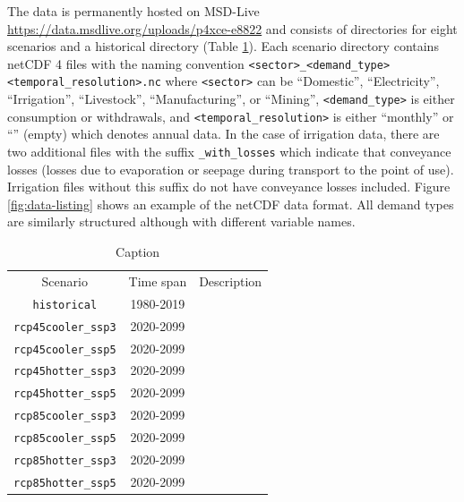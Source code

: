 \documentclass[fleqn,10pt]{wlscirep}
\begin{document}
The data is permanently hosted on MSD-Live \url{https://data.msdlive.org/uploads/p4xce-e8822} and consists of directories for eight scenarios and a historical directory (Table \ref{tab:scenarios}). Each scenario directory contains netCDF 4 files with the naming convention \verb|<sector>_<demand_type><temporal_resolution>.nc| where \verb|<sector>| can be ``Domestic'', ``Electricity'', ``Irrigation'', ``Livestock'', ``Manufacturing'', or ``Mining'', \verb|<demand_type>| is either consumption or withdrawals, and \verb|<temporal_resolution>| is either ``monthly'' or ``'' (empty) which denotes annual data. In the case of irrigation data, there are two additional files with the suffix \verb|_with_losses| which indicate that conveyance losses (losses due to evaporation or seepage during transport to the point of use). Irrigation files without this suffix do not have conveyance losses included. Figure \ref{fig:data-listing} shows an example of the netCDF data format. All demand types are similarly structured although with different variable names. 

\begin{table}
    \centering
    \begin{tabular}{ccc}
        Scenario & Time span & Description \\
        \verb|historical| & 1980-2019 & \\
        \verb|rcp45cooler_ssp3| & 2020-2099 & \\
        \verb|rcp45cooler_ssp5| & 2020-2099 & \\
        \verb|rcp45hotter_ssp3| & 2020-2099 & \\
        \verb|rcp45hotter_ssp5| & 2020-2099 & \\
        \verb|rcp85cooler_ssp3| & 2020-2099 & \\
        \verb|rcp85cooler_ssp5| & 2020-2099 & \\
        \verb|rcp85hotter_ssp3| & 2020-2099 & \\
        \verb|rcp85hotter_ssp5| & 2020-2099 & \\
    \end{tabular}
    \caption{Caption}
    \label{tab:scenarios}
\end{table}
\end{document}
